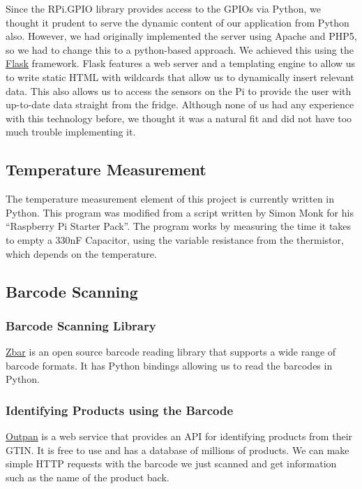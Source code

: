 \documentclass[10pt]{article}
\begin{document}
Since the RPi.GPIO library provides access to the GPIOs via Python, we thought it prudent to serve the dynamic content of our application from Python also. However, we had originally implemented the server using Apache and PHP5, so we had to change this to a python-based approach. We achieved this using the \href{http://flask.pocoo.org/}{Flask} framework. Flask features a web server and a templating engine to allow us to write static HTML with wildcards that allow us to dynamically insert relevant data. This also allows us to access the sensors on the Pi to provide the user with up-to-date data straight from the fridge. Although none of us had any experience with this technology before, we thought it was a natural fit and did not have too much trouble implementing it.

\subsection{Temperature Measurement}

The temperature measurement element of this project is currently written in Python. This program was modified from a script written by Simon Monk for his ``Raspberry Pi Starter Pack''. The program works by measuring the time it takes to empty a 330nF Capacitor, using the variable resistance from the thermistor, which depends on the temperature. 

\subsection{Barcode Scanning}
\subsubsection{Barcode Scanning Library}

\href{http://zbar.sourceforge.net/}{Zbar} is an open source barcode reading library that supports a wide range of barcode formats. It has Python bindings allowing us to read the barcodes in Python.

\subsubsection{Identifying Products using the Barcode}

\href{https://www.outpan.com/}{Outpan} is a web service that provides an API for identifying products from their GTIN. It is free to use and has a database of millions of products. We can make simple HTTP requests with the barcode we just scanned and get information such as the name of the product back.
\end{document}
